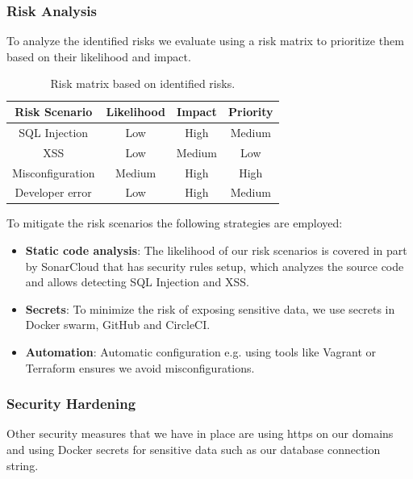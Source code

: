 \subsubsection*{Risk Analysis}
To analyze the identified risks we evaluate using a risk matrix to prioritize them based on their likelihood and impact.

\begin{table} [H]
    \centering
    \begin{tabular}{|c||c|c|c|}
        \hline
        Risk Scenario & Likelihood & Impact & Priority \\ \hline\hline
        SQL Injection & Low & High & Medium\\ \hline
        XSS & Low & Medium & Low \\ \hline 
        Misconfiguration & Medium & High & High \\ \hline 
        Developer error & Low & High & Medium \\ \hline
    \end{tabular}
    \caption{Risk matrix based on identified risks.}
    \label{tab:risk_matrix}
\end{table}

To mitigate the risk scenarios the following strategies are employed:
\begin{itemize}
    \item \textbf{Static code analysis}: The likelihood of our risk scenarios is covered in part by SonarCloud that has security rules setup, which analyzes the source code and allows detecting SQL Injection and XSS. %
    \item \textbf{Secrets}: To minimize the risk of exposing sensitive data, we use secrets in Docker swarm, GitHub and CircleCI. 
    \item \textbf{Automation}: Automatic configuration e.g. using tools like Vagrant or Terraform ensures we avoid misconfigurations.
\end{itemize}

\subsubsection*{Security Hardening}

Other security measures that we have in place are using https on our domains and using Docker secrets for sensitive data such as our database connection string.\\

